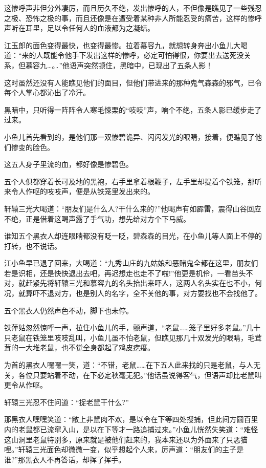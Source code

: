 \documentclass[12pt,oneside]{book}
\begin{document}
这惨呼声非但分外凄厉，而且历久不绝，发出惨呼的人，不但像是瞧见了一些残忍之极、恐怖之极的事，而且还像是在遭受着某种非人所能忍受的痛苦，这样的惨呼声听在耳里，足以令任何人的血液都为之凝结。

江玉郎的面色变得最快，也变得最惨。拉着慕容九，就想转身奔出小鱼儿大喝道：``来的人既能令他手下发出这样的惨呼，必定可怕得很，你要出去送死没关系，但慕容九\ldots。．''他语声突然顿住，黑暗中，已现出了五条人影！

这时虽然还没有人能瞧见他们的面目，但他们带进来的那种鬼气森森的邪气，已令每个人掌心都沁出了冷汗。

黑暗中，只听得一阵阵令人寒毛悚栗的``吱吱''声，响个不绝，五条人影已缓步走了过来。

小鱼儿首先看到的，是他们那一双惨碧诡异、闪闪发光的眼睛，接着，便瞧见了他们惨变的脸色。

这五人身子里流的血，都好像是惨碧色。

五个人俱都穿着长可及地的黑袍，右手里拿着根鞭子，左手里却提着个铁笼，那听来令人作呕的吱吱声，便是从铁笼里发出来的。

轩辕三光大喝道：``朋友们是什么人?干什么来的?''他喝声有如霹雷，震得山谷回应不绝，正是借着这喝声露了手气功，想先给对方个下马威。

谁知五个黑衣人却连眼睛都没有眨一眨，碧森森的目光，在小鱼儿等人面上不停的打转，也不说话。

江小鱼早已退了回来，大喝道：``九秀山庄的九姑娘和恶赌鬼全都在这里，朋友们若是识相，还是快快退出去吧，再迟想走也走不了啦!''他更是机伶，一看苗头不对，就赶紧先将轩辕三光和慕容九的名头抬出来吓人，这两人名头实在也不小，何况，就算吓不退对方，也是别人的名字，全不关他的事，对方要找也不会找他了。

五个黑衣人仍然声色不动，脚下也未停。

铁萍姑忽然惊呼一声，拉住小鱼儿的手，颤声道，``老鼠\ldots\ldots 笼子里好多老鼠。''几十只老鼠在铁笼里吱吱乱叫，小鱼儿虽不怕老鼠，但瞧见那几十双发光的眼睛，毛茸茸的一大堆老鼠，也不觉全身都起了鸡皮疙瘩。

为首的黑衣人嘿嘿一笑，道：``不错，老鼠\ldots\ldots 在下五人此来找的只是老鼠，与人无关，各位只要站着不动，在下必定秋毫无犯。''他话虽说得客气，但语声却比老鼠叫更令从作呕。

轩辕三光忍不住问道：``捉老鼠干什么?''

那黑衣人嘿嘿笑道：``敝上非鼠肉不欢，是以令在下等四处搜捕，但此间方圆百里内的老鼠都已流窜入山，是以在下等才一路追捕过来。''小鱼儿恍然失笑道：``难怪这山洞里老鼠特别多，原来就是被他们赶来的，我本来还以为外面来了只恶猫哩。''轩辕三光面色却微微一变，似乎想起个人来，厉声道：``朋友们的主子是谁?''那黑衣人不再答话，却挥了挥手。
\end{document}
